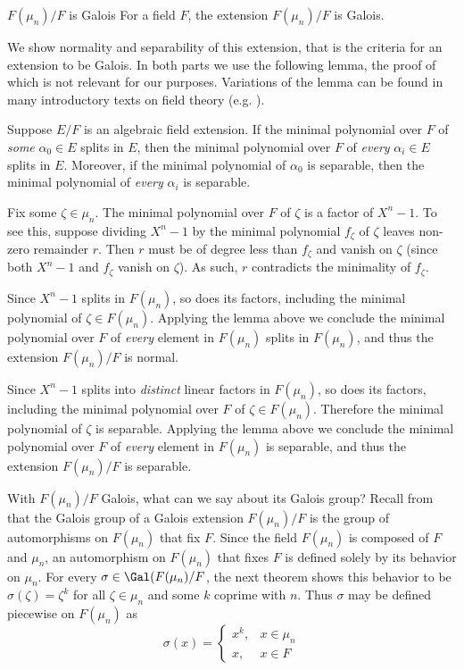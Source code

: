 \begin{theorem}[F(mu_n)/F is Galois]{$F(\mu_n)/F$ is Galois}
    For a field $F$, the extension $F(\mu_n)/F$ is Galois.

    \proof
    We show normality and separability of this extension, that is the criteria for an extension to be Galois.
    In both parts we use the following lemma, the proof of which is not relevant for our purposes.
    Variations of the lemma can be found in many introductory texts on field theory (e.g. \cite{Mitchell}).
    \begin{lemma}
        Suppose $E/F$ is an algebraic field extension.
        If the minimal polynomial over $F$ of \emph{some} $\alpha_0\in E$ splits in $E$, then the minimal polynomial over $F$ of \emph{every} $\alpha_i\in E$ splits in $E$.
        Moreover, if the minimal polynomial of $\alpha_0$ is separable, then the minimal polynomial of \emph{every} $\alpha_i$ is separable.
    \end{lemma}

    Fix some $\zeta\in\mu_n$.
    The minimal polynomial over $F$ of $\zeta$ is a factor of $X^n-1$.
    To see this, suppose dividing $X^n-1$ by the minimal polynomial $f_\zeta$ of $\zeta$ leaves non-zero remainder $r$.
    Then $r$ must be of degree less than $f_\zeta$ and vanish on $\zeta$ (since both $X^n-1$ and $f_\zeta$ vanish on $\zeta$).
    As such, $r$ contradicts the minimality of $f_\zeta$.

    Since $X^n-1$ splits in $F(\mu_n)$, so does its factors, including the minimal polynomial of $\zeta\in F(\mu_n)$.
    Applying the lemma above we conclude the minimal polynomial over $F$ of \emph{every} element in $F(\mu_n)$ splits in $F(\mu_n)$, and thus the extension $F(\mu_n)/F$ is normal.

    Since $X^n-1$ splits into \emph{distinct} linear factors in $F(\mu_n)$, so does its factors, including the minimal polynomial over $F$ of $\zeta\in F(\mu_n)$.
    Therefore the minimal polynomial of $\zeta$ is separable.
    Applying the lemma above we conclude the minimal polynomial over $F$ of \emph{every} element in $F(\mu_n)$ is separable, and thus the extension $F(\mu_n)/F$ is separable.
\end{theorem}

With $F(\mu_n)/F$ Galois, what can we say about its Galois group?
Recall from  that the Galois group of a Galois extension $F(\mu_n)/F$ is the group of automorphisms on $F(\mu_n)$ that fix $F$.
Since the field $F(\mu_n)$ is composed of $F$ and $\mu_n$, an automorphism on $F(\mu_n)$ that fixes $F$ is defined solely by its behavior on $\mu_n$.
For every $\sigma\in\Gal(F(\mu_n)/F$, the next theorem shows this behavior to be $\sigma(\zeta) = \zeta^k$ for all $\zeta\in\mu_n$ and some $k$ coprime with $n$.
Thus $\sigma$ may be defined piecewise on $F(\mu_n)$ as
\begin{equation}
    \sigma(x) =
    \begin{cases}
        x^k, & x \in\mu_n \\
        x, & x \in F
    \end{cases}
\end{equation}

